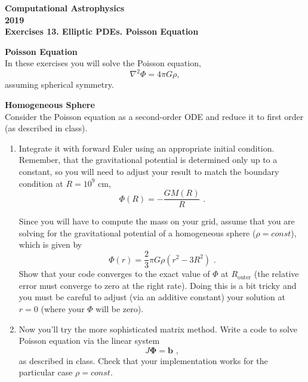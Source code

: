 \documentclass[11pt]{article}
\begin{document}
\begin{center}
\large \bf Computational Astrophysics \rm \\
2019\\
{\small Exercises 13. Elliptic PDEs. Poisson Equation}
\end{center}

\textbf{Poisson Equation} \\
In these exercises you will solve the Poisson equation,
\begin{equation}
\nabla^2 \Phi = 4\pi G \rho,
\end{equation}
assuming spherical symmetry. 

\textbf{Homogeneous Sphere}\\
Consider the Poisson equation as a
  second-order ODE  and reduce it
  to first order (as described in class). 
\begin{enumerate}
\item Integrate it with forward Euler 
  using an appropriate initial condition.  Remember, that
  the gravitational potential is determined only up to a constant, so
  you will need to adjust your result to match the boundary condition at $R=10^9 \text{ cm}$,
  \begin{equation}
    \Phi(R) = -\frac{G M(R)}{R}\,\,.
  \end{equation}

  Since you will have to compute the mass on your grid,
  assume that you are solving for the gravitational
  potential of a homogeneous sphere ($\rho = const$), which is given by
  \begin{equation}
    \Phi(r) = \frac{2}{3}\pi G \rho  (r^2 - 3 R^2)\,\,.
  \end{equation}
  Show that your code converges to the exact value of $\Phi$ at
  $R_\text{outer}$ (the relative error must converge to zero at the
  right rate). Doing this is a bit tricky and you must be careful to
  adjust (via an additive constant) your solution at $r=0$ (where your
  $\Phi$ will be zero).

\item Now you'll try the more sophisticated matrix method. 
Write a code to solve Poisson equation via the linear system
\begin{equation}
J\mathbf{\Phi} = \mathbf{b}\,\,,
\end{equation}
as described in class. Check that your implementation works for the 
particular case $\rho = const$. 
\end{enumerate}
  
\end{document}
